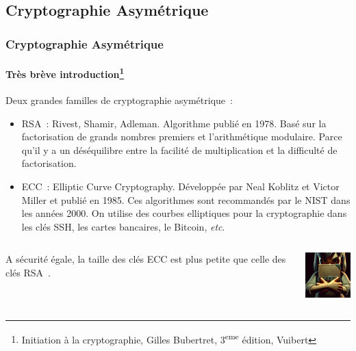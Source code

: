 \documentclass{beamer}
\begin{document}
    \subsection{Cryptographie Asymétrique}\label{subsec:cryptographie-asymetrique}
    \begin{frame}
        \frametitle{Cryptographie Asymétrique}
        \framesubtitle{Très brève introduction\footnote{Initiation à la cryptographie, Gilles Bubertret, 3\textsuperscript{eme} édition, Vuibert}}
        \transdissolve
        Deux grandes familles de cryptographie asymétrique~:
        \begin{itemize}
            \item RSA~: Rivest, Shamir, Adleman.
            Algorithme publié en 1978.
            Basé sur la factorisation de grands nombres premiers et l'arithmétique modulaire.
            Parce qu'il y a un déséquilibre entre la facilité de multiplication et la difficulté de factorisation.
            \item ECC~: Elliptic Curve Cryptography.
            Développée par Neal Koblitz et Victor Miller et publié en 1985.
            Ces algorithmes sont recommandés par le NIST dans les années 2000.
            On utilise des courbes elliptiques pour la cryptographie dans les clés SSH, les cartes bancaires, le Bitcoin, \textit{etc}.
        \end{itemize}
        \begin{columns}
            \begin{column}{0.8\textwidth}
                A sécurité égale, la taille des clés ECC est plus petite que celle des clés RSA~.
            \end{column}
            \begin{column}{0.2\textwidth}
                \centering
                \includegraphics[width=2cm]{image/girl-hiding-a-secret}
            \end{column}
        \end{columns}
    \end{frame}
\end{document}

